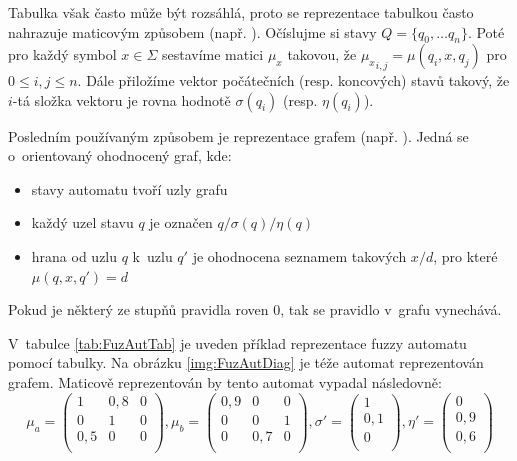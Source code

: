 Tabulka však často může být rozsáhlá, proto se reprezentace tabulkou často nahrazuje maticovým způsobem (např. \cite{SnaKepAbrHas-AproxStriMatchFuzzAut, StaCir-ConsFuzzAutFuzzRegExp}). Očíslujme si stavy $Q = \{ q_0, \dots q_n \}$. Poté pro každý symbol $x \in \Sigma$ sestavíme matici $\mu_x$ takovou, že ${\mu_{x}}_{i,j} = \mu(q_i, x, q_j)$ pro $0 \leq i,j \leq n$. Dále přiložíme vektor počátečních (resp. koncových) stavů takový, že $i$-tá složka vektoru je rovna hodnotě $\sigma(q_i)$ (resp. $\eta(q_i)$).

Posledním používaným způsobem je reprezentace grafem (např. \cite{DooKre-NewDirFuzzAut, GonGar-FuzzLangInfRanAccGuzzAutPumLemDetProc, StaCir-ConsFuzzAutFuzzRegExp}). Jedná se o~orientovaný ohodnocený graf, kde:
\begin{itemize}
 \item stavy automatu tvoří uzly grafu
 \item každý uzel stavu $q$ je označen $q / \sigma(q) / \eta(q)$
 \item hrana od uzlu $q$ k~uzlu $q'$ je ohodnocena seznamem takových $x / d$, pro které $\mu(q, x, q') = d$
\end{itemize}

Pokud je některý ze stupňů pravidla roven $0$, tak se pravidlo v~grafu vynechává.

\begin{example} \label{ex:FuzAut}
  V~tabulce \ref{tab:FuzAutTab} je uveden příklad reprezentace fuzzy automatu pomocí tabulky. Na obrázku \ref{img:FuzAutDiag} je téže automat reprezentován grafem. Maticově reprezentován by tento automat vypadal následovně:
  $$
  \mu_a = 
    \begin{pmatrix}
     1 		& 0{,}8 	& 0 \\
     0 		& 1 		& 0 \\
     0{,}5 	& 0		& 0 \\
    \end{pmatrix},
  \mu_b = 
    \begin{pmatrix}
     0{,}9 	& 0	 	& 0 \\
     0 		& 0 		& 1 \\
     0	 	& 0{,}7		& 0 \\
    \end{pmatrix},
  \sigma' = 
    \begin{pmatrix}
     1 		\\
     0{,}1 	\\
     0		\\
    \end{pmatrix},
  \eta' = 
    \begin{pmatrix}
     0 		\\
     0{,}9 	\\
     0{,}6	\\
    \end{pmatrix}
  $$
\end{example}

